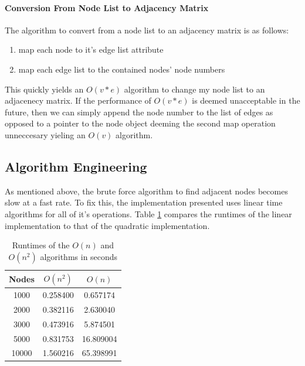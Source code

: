 \documentclass{article}
\begin{document}
	\paragraph{Conversion From Node List to Adjacency Matrix}
    The algorithm to convert from a node list to an adjacency matrix is as follows:
    \begin{enumerate}
      \item map each node to it's edge list attribute
      \item map each edge list to the contained nodes' node numbers
    \end{enumerate}
		This quickly yields an $O(v*e)$ algorithm to change my node list to an adjacenecy matrix.
		If the performance of $O(v*e)$ is deemed unacceptable in the future, then we can simply append the node number to the list of edges as opposed to a pointer to the node object deeming the second map operation unneccesary yieling an $O(v)$ algorithm.
  \subsection{Algorithm Engineering}
    As mentioned above, the brute force algorithm to find adjacent nodes becomes slow at a fast rate.
    To fix this, the implementation presented uses linear time algorithms for all of it's operations.
	  Table \ref{runtime_comparison_table_brute} compares the runtimes of the linear implementation to that of the quadratic implementation.

	  \begin{center}
  	  \begin{table}
        \label{runtime_comparison_table_brute}
  		\begin{tabular}{ |c|c|c| }
  			\hline
  			Nodes & $O(n^2)$ & $O(n)$ \\
  			\hline
  			  1000 & 0.258400 & 0.657174 \\
  			  \hline
  			  2000 & 0.382116 & 2.630040 \\
  			  \hline
  			  3000 & 0.473916 & 5.874501 \\
  			  \hline
  			  5000 & 0.831753 & 16.809004 \\
  			  \hline
  			  10000 & 1.560216 & 65.398991 \\
  			\hline
  		\end{tabular}
  		\caption{Runtimes of the $O(n)$ and $O(n^2)$ algorithms in seconds}
  	  \end{table}
	  \end{center}
\end{document}
